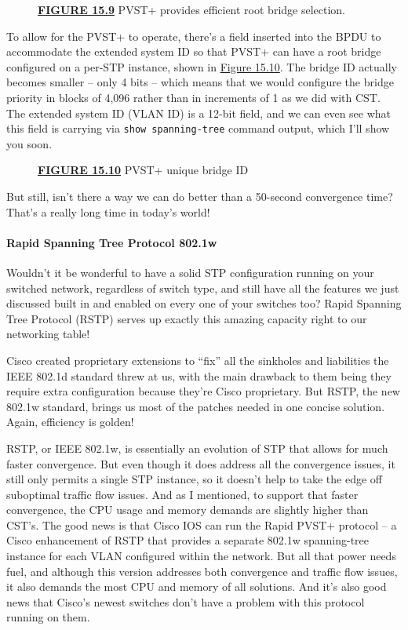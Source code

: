 \begin{figure}
\centering
\caption{{\protect\hyperlink{c15.xhtmlux5cux23figureanchor15-9}{\textbf{FIGURE
15.9}} PVST+ provides efficient root bridge selection.}}
\end{figure}

To allow for the PVST+ to operate, there's a field inserted into the
BPDU to accommodate the extended system ID so that PVST+ can have a root
bridge configured on a per-STP instance, shown in
\protect\hyperlink{c15.xhtmlux5cux23figure15-10}{Figure 15.10}. The
bridge ID actually becomes smaller -- only 4 bits -- which means that we
would configure the bridge priority in blocks of 4,096 rather than in
increments of 1 as we did with CST. The extended system ID (VLAN ID) is
a 12-bit field, and we can even see what this field is carrying via
\texttt{show\ spanning-tree} command output, which I'll show you soon.

\begin{figure}
\centering
\caption{{\protect\hyperlink{c15.xhtmlux5cux23figureanchor15-10}{\textbf{FIGURE
15.10}} PVST+ unique bridge ID}}
\end{figure}

But still, isn't there a way we can do better than a 50-second
convergence time? That's a really long time in today's world!

\paragraph{Rapid Spanning Tree Protocol 802.1w}

Wouldn't it be wonderful to have a solid STP configuration running on
your switched network, regardless of switch type, and still have all the
features we just discussed built
in and enabled on
every one of your switches too? Rapid Spanning Tree Protocol (RSTP)
serves up exactly this amazing capacity right to our networking table!

Cisco created proprietary extensions to ``fix'' all the sinkholes and
liabilities the IEEE 802.1d standard threw at us, with the main drawback
to them being they require extra configuration because they're Cisco
proprietary. But RSTP, the new 802.1w standard, brings us most of the
patches needed in one concise solution. Again, efficiency is golden!

RSTP, or IEEE 802.1w, is essentially an evolution of STP that allows for
much faster convergence. But even though it does address all the
convergence issues, it still only permits a single STP instance, so it
doesn't help to take the edge off suboptimal traffic flow issues. And as
I mentioned, to support that faster convergence, the CPU usage and
memory demands are slightly higher than CST's. The good news is that
Cisco IOS can run the Rapid PVST+ protocol -- a Cisco enhancement of RSTP
that provides a separate 802.1w spanning-tree instance for each VLAN
configured within the network. But all that power needs fuel, and
although this version addresses both convergence and traffic flow
issues, it also demands the most CPU and memory of all solutions. And
it's also good news that Cisco's newest switches don't have a problem
with this protocol running on them.

